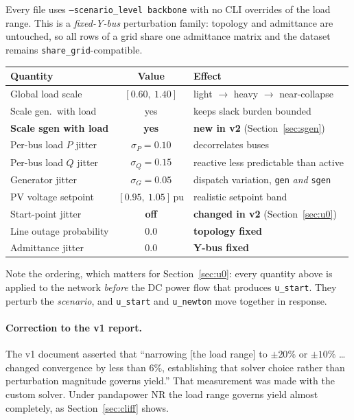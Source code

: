 \documentclass{article}
\begin{document}
Every file uses \texttt{--scenario\_level backbone} with no CLI overrides of the
load range.  This is a \emph{fixed-Y-bus} perturbation family: topology and
admittance are untouched, so all rows of a grid share one admittance matrix and
the dataset remains \texttt{share\_grid}-compatible.

\begin{center}
\begin{tabular}{lcl}
\toprule
\textbf{Quantity} & \textbf{Value} & \textbf{Effect} \\
\midrule
Global load scale        & $[0.60,\ 1.40]$      & light $\to$ heavy $\to$ near-collapse \\
Scale gen.\ with load    & yes                  & keeps slack burden bounded \\
\textbf{Scale sgen with load} & \textbf{yes}    & \textbf{new in v2} (Section~\ref{sec:sgen}) \\
Per-bus load $P$ jitter  & $\sigma_P = 0.10$    & decorrelates buses \\
Per-bus load $Q$ jitter  & $\sigma_Q = 0.15$    & reactive less predictable than active \\
Generator jitter         & $\sigma_G = 0.05$    & dispatch variation, \texttt{gen} \emph{and} \texttt{sgen} \\
PV voltage setpoint      & $[0.95,\ 1.05]$\,pu  & realistic setpoint band \\
Start-point jitter       & \textbf{off}         & \textbf{changed in v2} (Section~\ref{sec:u0}) \\
\midrule
Line outage probability  & $0.0$                & \textbf{topology fixed} \\
Admittance jitter        & $0.0$                & \textbf{Y-bus fixed} \\
\bottomrule
\end{tabular}
\end{center}

\noindent
Note the ordering, which matters for Section~\ref{sec:u0}: every quantity above
is applied to the network \emph{before} the DC power flow that produces
\texttt{u\_start}.  They perturb the \emph{scenario}, and \texttt{u\_start} and
\texttt{u\_newton} move together in response.

\paragraph{Correction to the v1 report.}
The v1 document asserted that ``narrowing [the load range] to $\pm20\%$ or
$\pm10\%$ \dots changed convergence by less than $6\%$, establishing that
solver choice rather than perturbation magnitude governs yield.''  That
measurement was made with the custom solver.  Under pandapower NR the load
range governs yield almost completely, as Section~\ref{sec:cliff} shows.
\end{document}
